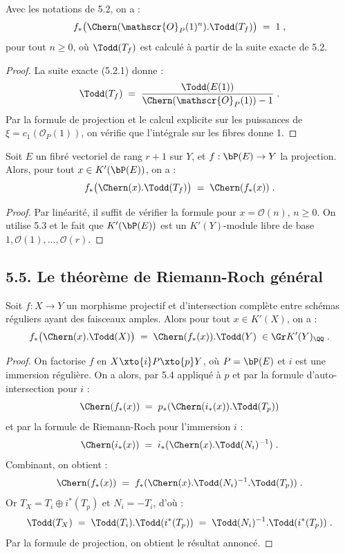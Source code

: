 \begin{proposition}[5.3]%
Avec les notations de 5.2, on a :
\[
f_*\bigl(\Chern(\mathscr{O}_P(1)^n) . \Todd(T_f)\bigr) \; = \; 1\; ,
\]
pour tout $n \geq 0$, où $\Todd(T_f)$ est calculé à partir de la suite exacte de 5.2.
\end{proposition}

\begin{proof}
La suite exacte (5.2.1) donne :
\[
\Todd(T_f) \; = \; \frac{\Todd(E(1))}{\Chern(\mathscr{O}_P(1)) - 1}\; .
\]
Par la formule de projection et le calcul explicite sur les puissances de $\xi = c_1(\mathscr{O}_P(1))$, on vérifie que l'intégrale sur les fibres donne 1.
\end{proof}

\begin{theoreme}[5.4]%
Soit $E$ un fibré vectoriel de rang $r+1$ sur $Y$, et $f : \bP(E) \to Y$ la projection. Alors, pour tout $x \in K'(\bP(E))$, on a :
\[
f_*\bigl(\Chern(x) . \Todd(T_f)\bigr) \; = \; \Chern(f_*(x))\; .
\]
\end{theoreme}

\begin{proof}
Par linéarité, il suffit de vérifier la formule pour $x = \mathscr{O}(n)$, $n \geq 0$. On utilise 5.3 et le fait que $K'(\bP(E))$ est un $K'(Y)$-module libre de base $1, \mathscr{O}(1), \ldots, \mathscr{O}(r)$.
\end{proof}


\subsection*{5.5. Le théorème de Riemann-Roch général}

\begin{theoreme}[5.5]%
Soit $f : X \to Y$ un morphisme projectif et d'intersection complète entre schémas réguliers ayant des faisceaux amples. Alors pour tout $x \in K'(X)$, on a :
\[
f_*\bigl(\Chern(x) . \Todd(X)\bigr) \; = \; \Chern(f_*(x)) . \Todd(Y)\; \in \Gr K'(Y)_{\QQ}\; .
\]
\end{theoreme}

\begin{proof}
On factorise $f$ en $X \xto{i} P \xto{p} Y$, où $P = \bP(E)$ et $i$ est une immersion régulière. On a alors, par 5.4 appliqué à $p$ et par la formule d'auto-intersection pour $i$ :
\[
\Chern(f_*(x)) \; = \; p_*(\Chern(i_*(x)) . \Todd(T_p))
\]
et par la formule de Riemann-Roch pour l'immersion $i$ :
\[
\Chern(i_*(x)) \; = \; i_*(\Chern(x) . \Todd(N_i)^{-1})\; .
\]
Combinant, on obtient :
\[
\Chern(f_*(x)) \; = \; f_*(\Chern(x) . \Todd(N_i)^{-1} . \Todd(T_p))\; .
\]
Or $T_X = T_i \oplus i^*(T_p)$ et $N_i = -T_i$, d'où :
\[
\Todd(T_X) \; = \; \Todd(T_i) . \Todd(i^*(T_p)) \; = \; \Todd(N_i)^{-1} . \Todd(i^*(T_p))\; .
\]
Par la formule de projection, on obtient le résultat annoncé.
\end{proof}

